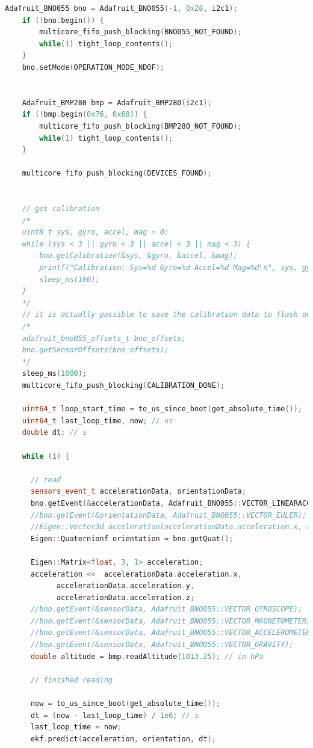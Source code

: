 \documentclass{article}
\begin{document}
\begin {lstlisting}[language=C++]
    Adafruit_BNO055 bno = Adafruit_BNO055(-1, 0x28, i2c1);
    if (!bno.begin()) {
        multicore_fifo_push_blocking(BNO055_NOT_FOUND);
        while(1) tight_loop_contents();
    }
    bno.setMode(OPERATION_MODE_NDOF);


    Adafruit_BMP280 bmp = Adafruit_BMP280(i2c1);
    if (!bmp.begin(0x76, 0x60)) {
        multicore_fifo_push_blocking(BMP280_NOT_FOUND);
        while(1) tight_loop_contents();
    }
    
    multicore_fifo_push_blocking(DEVICES_FOUND);


    // get calibration
    /*
    uint8_t sys, gyro, accel, mag = 0;
    while (sys < 3 || gyro < 3 || accel < 3 || mag < 3) {
        bno.getCalibration(&sys, &gyro, &accel, &mag);
        printf("Calibration: Sys=%
        sleep_ms(100);
    }
    */
    // it is actually possible to save the calibration data to flash on the pico but it is not implemented here
    /*
    adafruit_bno055_offsets_t bno_offsets;
    bno.getSensorOffsets(bno_offsets);    
    */
    sleep_ms(1000);
    multicore_fifo_push_blocking(CALIBRATION_DONE);

    uint64_t loop_start_time = to_us_since_boot(get_absolute_time());
    uint64_t last_loop_time, now; // us
    double dt; // s

    while (1) {

      // read
      sensors_event_t accelerationData, orientationData;
      bno.getEvent(&accelerationData, Adafruit_BNO055::VECTOR_LINEARACCEL);
      //bno.getEvent(&orientationData, Adafruit_BNO055::VECTOR_EULER);
      //Eigen::Vector3d acceleration(accelerationData.acceleration.x, accelerationData.acceleration.y, accelerationData.acceleration.z);
      Eigen::Quaternionf orientation = bno.getQuat();

      Eigen::Matrix<float, 3, 1> acceleration;
      acceleration <<  accelerationData.acceleration.x, 
            accelerationData.acceleration.y, 
            accelerationData.acceleration.z;
      //bno.getEvent(&sensorData, Adafruit_BNO055::VECTOR_GYROSCOPE);
      //bno.getEvent(&sensorData, Adafruit_BNO055::VECTOR_MAGNETOMETER);
      //bno.getEvent(&sensorData, Adafruit_BNO055::VECTOR_ACCELEROMETER);
      //bno.getEvent(&sensorData, Adafruit_BNO055::VECTOR_GRAVITY);
      double altitude = bmp.readAltitude(1013.25); // in hPa

      // finished reading

      now = to_us_since_boot(get_absolute_time());
      dt = (now - last_loop_time) / 1e6; // s
      last_loop_time = now;
      ekf.predict(acceleration, orientation, dt);


\end{lstlisting}
\end{document}
